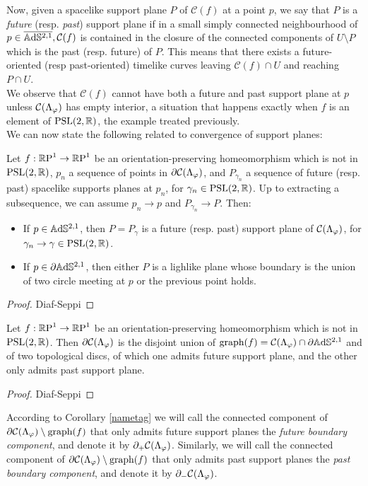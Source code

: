 Now, given a spacelike support plane $P$ of $\mathcal{C}(f)$ at a point $p$, we say that $P$ is a \textit{future} (resp. \textit{past})  support plane if in a small simply connected neighbourhood of
$p\in\overline{\A^{2,1}}, \mathcal{C}(f)$ is contained in the closure of the connected components of $U\setminus P$ which is the past (resp. future) of $P$. This means that there exists a future-oriented (resp past-oriented) timelike curves leaving $\mathcal{C}(f)\cap U$ and reaching $P\cap U$. \\
We observe that $\mathcal{C}(f)$ cannot have both a future and past support plane at $p$ unless $\CF$ has empty interior, a situation that happens exactly when $f$ is an element of $\PSL$, the example treated previously.\\
We can now state the following related to convergence of support planes: 
\begin{lemma}\label{49}
    Let $f:\S\to\S$ be an orientation-preserving homeomorphism which is not in $\PSL$, $p_n$ a sequence of points in $\partial\CF$, and $P_{\gamma_n}$ a sequence of future (resp. past) spacelike supports planes at $p_n$, for $\gamma_n\in\PSL$. Up to extracting a subsequence, we can assume $p_n\to p$ and $P_{\gamma_n}\to P.$ Then: 
    \begin{itemize}
        \item If $p\in\A^{2,1}$, then $P=P_\gamma$ is a future (resp. past) support plane of $\CF$, for $\gamma_n\to\gamma\in\PSL$.
        \item If $p\in\partial\A^{2,1}$, then either $P$ is a lighlike plane whose boundary is the union of two circle meeting at $p$ or the previous point holds.        
    \end{itemize}
\end{lemma}
\begin{proof}
    Diaf-Seppi
\end{proof}
\begin{corollary}\label{nametag}
    Let $f:\S\to\S$ be an orientation-preserving homeomorphism which is not in $\PSL$. Then $\partial\CF$ is the disjoint union of $\text{graph}(f)=\CF\cap\partial\A^{2,1}$ and of two topological discs, of which one admits future support plane, and the other only admits past support plane. 
\end{corollary}
\begin{proof}
    Diaf-Seppi
\end{proof}

According to Corollary \ref{nametag} we will call the connected component of $\partial\CF\setminus\text{graph}(f)$ that only admits future support planes the \textit{future boundary component}, and denote it by $\partial_+\CF$. Similarly, we will call the connected component of $\partial\CF\setminus\text{graph}(f)$ that only admits past support planes the \textit{past boundary component}, and denote it by $\partial_-\CF$.\\

